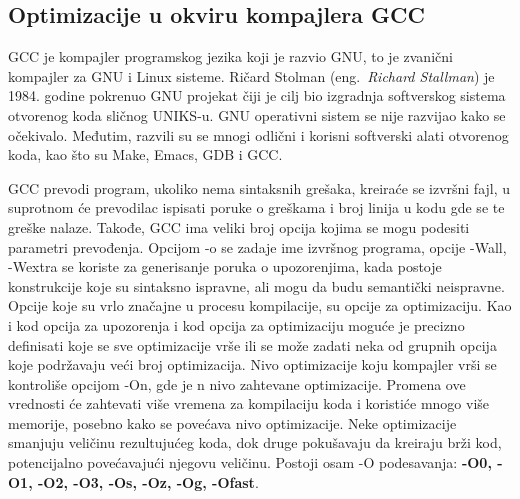 \documentclass[a4paper]{article}
\begin{document}
\subsection{Optimizacije u okviru kompajlera GCC}
\label{subsec:optimizacijeGCC}

GCC je kompajler programskog jezika koji je razvio GNU, to je zvanični kompajler za GNU i Linux sisteme. Ričard Stolman (eng.~{\em Richard Stallman}) je 1984. godine pokrenuo GNU projekat čiji je cilj bio izgra\-dnja softverskog sistema otvorenog koda sličnog UNIKS-u. GNU operativni sistem se nije razvijao kako se očekivalo. Međutim, razvili su se mnogi odlični i korisni softverski alati otvorenog koda, kao što su Make, Emacs, GDB i GCC. \cite{gccVsClang}

GCC prevodi program, ukoliko nema sintaksnih grešaka, kreiraće se izvršni fajl, u suprotnom će prevodilac ispisati poruke o greškama i broj linija u kodu gde se te greške nalaze. Takođe, GCC ima veliki broj opcija kojima se mogu podesiti parametri prevođenja. Opcijom -o se zadaje ime izvršnog programa, opcije -Wall, -Wextra se koriste za generisanje poruka o upozorenjima, kada postoje konstrukcije koje su sintaksno ispravne, ali mogu da budu semantički neispravne. Opcije koje su vrlo značajne u procesu kompilacije, su opcije za optimizaciju. Kao i kod opcija za upozorenja i kod opcija za optimizaciju moguće je precizno definisati koje se sve optimizacije vrše ili se može zadati neka od grupnih opcija koje podržavaju veći broj optimizacija. Nivo optimizacije koju kompajler vrši se kontroliše opcijom -On, gde je n nivo zahtevane optimizacije. Promena ove vrednosti će zahtevati više vremena za kompilaciju koda i koristiće mnogo više memorije, posebno kako se povećava nivo optimizacije. \cite{gnuSamardzic} Neke optimizacije smanjuju veličinu rezultujućeg koda, dok druge pokušavaju da kreiraju brži kod, potencijalno povećavajući njegovu veličinu. Postoji osam -O podesavanja: \textbf{-O0, -O1, -O2, -O3, -Os, -Oz, -Og, -Ofast}.
\end{document}
